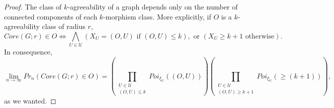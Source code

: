 \documentclass[11pt,notitlepage]{report}
\theoremstyle{definition}
\theoremstyle{remark}
\newcommand{\Ln}{\lim\limits_{n\to \infty}}
\begin{document}
\begin{proof}
	The class of $k$-agreeability of a graph depends only on the number
	of connected components of each $k$-morphism class. More explicitly, 
	if $O$ is a $k$-agreeability class of radius $r$, 
	\[Core(G;r)\in O \iff \bigwedge_{U\in \mathcal{U}} (X_U=(O,U) \text{ if }(O,U)\leq k), \text{ or }  (X_U\geq k+1 \text{ otherwise}).\]
	In consequence,
	\[ \Ln Pr_n(Core(G;r)\in O) = \left(\prod_{\substack{U\in \mathcal{U}\\(O,U)\leq k}} Poi_{\xi_U}((O,U)) \right) \left(\prod_{\substack{U\in \mathcal{U}\\(O,U)\geq k+1}}
	Poi_{\xi_U}(\geq (k+1)) \right),\]
	as we wanted.   
\end{proof}

 





\end{document}
